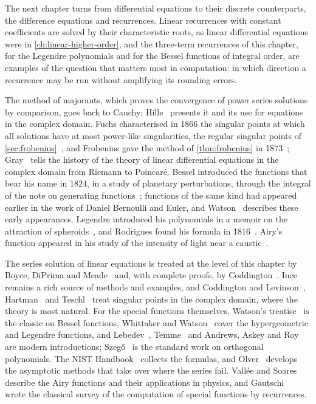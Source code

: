 The next chapter turns from differential equations to their discrete counterparts, the difference equations and recurrences. Linear recurrences with constant coefficients are solved by their characteristic roots, as linear differential equations were in \cref{ch:linear-higher-order}, and the three-term recurrences of this chapter, for the Legendre polynomials and for the Bessel functions of integral order, are examples of the question that matters most in computation: in which direction a recurrence may be run without amplifying its rounding errors.

\chapternotes

The method of majorants, which proves the convergence of power series solutions by comparison, goes back to Cauchy; Hille~\cite[Chap.~2]{hille1976} presents it and its use for equations in the complex domain. Fuchs characterised in 1866 the singular points at which all solutions have at most power-like singularities, the regular singular points of \cref{sec:frobenius}~\cite{fuchs1866}, and Frobenius gave the method of \cref{thm:frobenius} in 1873~\cite{frobenius1873}; Gray~\cite{gray2000} tells the history of the theory of linear differential equations in the complex domain from Riemann to Poincar\'e. Bessel introduced the functions that bear his name in 1824, in a study of planetary perturbations, through the integral of the note on generating functions~\cite{bessel1824}; functions of the same kind had appeared earlier in the work of Daniel Bernoulli and Euler, and Watson~\cite[Chap.~I]{watson1944} describes these early appearances. Legendre introduced his polynomials in a memoir on the attraction of spheroids~\cite{legendre1785}, and Rodrigues found his formula in 1816~\cite{rodrigues1816}. Airy's function appeared in his study of the intensity of light near a caustic~\cite{airy1838}.

The series solution of linear equations is treated at the level of this chapter by Boyce, DiPrima and Meade~\cite[Chap.~5]{boyce2017} and, with complete proofs, by Coddington~\cite[Chaps.~3 and~4]{coddington1961}. Ince~\cite{ince1926} remains a rich source of methods and examples, and Coddington and Levinson~\cite[Chaps.~4 and~5]{coddington1955}, Hartman~\cite{hartman2002} and Teschl~\cite[Chap.~4]{teschl2012} treat singular points in the complex domain, where the theory is most natural. For the special functions themselves, Watson's treatise~\cite{watson1944} is the classic on Bessel functions, Whittaker and Watson~\cite{whittaker1927} cover the hypergeometric and Legendre functions, and Lebedev~\cite{lebedev1972}, Temme~\cite{temme1996} and Andrews, Askey and Roy~\cite{andrews1999} are modern introductions; Szeg\H{o}~\cite{szego1975} is the standard work on orthogonal polynomials. The NIST Handbook~\cite{olver2010nist} collects the formulas, and Olver~\cite{olver1997asymptotics} develops the asymptotic methods that take over where the series fail. Vall\'ee and Soares~\cite{vallee2004} describe the Airy functions and their applications in physics, and Gautschi~\cite{gautschi1967} wrote the classical survey of the computation of special functions by recurrences.

\chapterreferences
